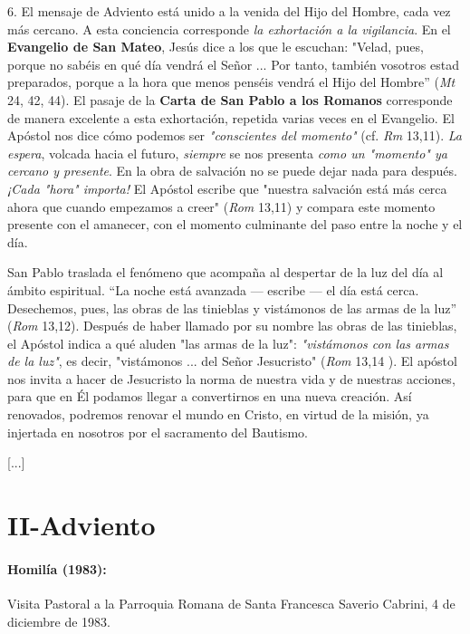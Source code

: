 \begin{body}
\begin{body}
6. El mensaje de Adviento está unido a la venida del Hijo del Hombre, cada vez más cercano. A esta conciencia corresponde \emph{la exhortación a la vigilancia}. En el \textbf{Evangelio de San Mateo}, Jesús dice a los que le escuchan: "Velad, pues, porque no sabéis en qué día vendrá el Señor ... Por tanto, también vosotros estad preparados, porque a la hora que menos penséis vendrá el Hijo del Hombre'' (\emph{Mt} 24, 42, 44). El pasaje de la \textbf{Carta de San Pablo a los Romanos} corresponde de manera excelente a esta exhortación, repetida varias veces en el Evangelio. El Apóstol nos dice cómo podemos ser \emph{"conscientes del momento"} (cf. \emph{Rm} 13,11). \emph{La espera}, volcada hacia el futuro, \emph{siempre} se nos presenta \emph{como un "momento" ya cercano y presente}. En la obra de salvación no se puede dejar nada para después. \emph{¡Cada "hora" importa!} El Apóstol escribe que "nuestra salvación está más cerca ahora que cuando empezamos a creer" (\emph{Rom} 13,11) y compara este momento presente con el amanecer, con el momento culminante del paso entre la noche y el día.

San Pablo traslada el fenómeno que acompaña al despertar de la luz del día al ámbito espiritual. ``La noche está avanzada --- escribe --- el día está cerca. Desechemos, pues, las obras de las tinieblas y vistámonos de las armas de la luz'' (\emph{Rom} 13,12). Después de haber llamado por su nombre las obras de las tinieblas, el Apóstol indica a qué aluden "las armas de la luz": \emph{"vistámonos con las armas de la luz"}, es decir, "vistámonos ... del Señor Jesucristo" (\emph{Rom} 13,14 ). El apóstol nos invita a hacer de Jesucristo la norma de nuestra vida y de nuestras acciones, para que en Él podamos llegar a convertirnos en una nueva creación. Así renovados, podremos renovar el mundo en Cristo, en virtud de la misión, ya injertada en nosotros por el sacramento del Bautismo.

{[}...{]}
\end{body} 
	
\chapter{II-Adviento}

\subsubsection{Homilía (1983): } Visita Pastoral a la Parroquia Romana de Santa Francesca Saverio Cabrini, 4 de diciembre de 1983.


\end{body}

